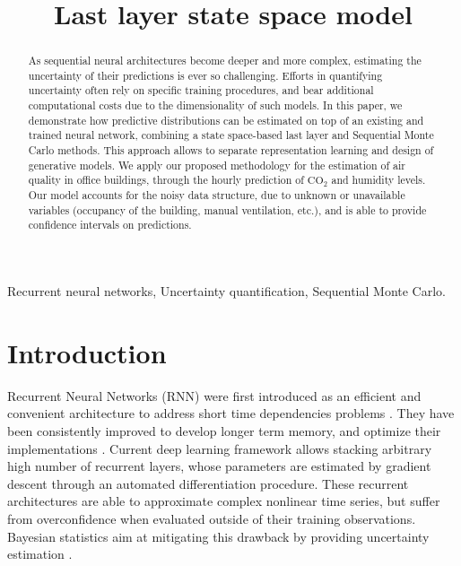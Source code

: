 \documentclass{article}
\title{Last layer state space model}
\begin{document}
\maketitle

\begin{abstract}
	As sequential neural architectures become deeper and more complex, estimating the uncertainty of their predictions is ever so challenging.
	Efforts in quantifying uncertainty often rely on specific training procedures, and bear additional computational costs due to the dimensionality of such models.
	In this paper, we demonstrate how predictive distributions can be estimated on top of an existing and trained neural network, combining a state space-based last layer and Sequential Monte Carlo methods. This approach allows to separate representation learning and design of generative models. We apply our proposed methodology for the estimation of air quality in office buildings, through the hourly prediction of \ensuremath{\mathrm{CO_2}} and humidity levels.
	Our model accounts for the noisy data structure, due to unknown or unavailable variables (occupancy of the building, manual ventilation, etc.), and is able to provide confidence intervals on predictions.
\end{abstract}

\begin{keywords}
	Recurrent neural networks, Uncertainty quantification, Sequential Monte Carlo.
\end{keywords}

\section{Introduction}
\label{sec:intro}

Recurrent Neural Networks (RNN) were first introduced as an efficient and convenient architecture to address short time dependencies problems \cite{Mozer1989AFB}.
They have been consistently improved to develop longer term memory, and optimize their implementations \cite{Bengio1994LearningLD,Hochreiter1997LongSM}.%
Current deep learning framework allows stacking arbitrary high number of recurrent layers, whose parameters are estimated by gradient descent through an automated differentiation procedure.
These recurrent architectures are able to approximate complex nonlinear time series, but suffer from overconfidence when evaluated outside of their training observations.
Bayesian statistics aim at mitigating this drawback by providing uncertainty estimation \cite{Hinton1995BayesianLF}.
\end{document}
